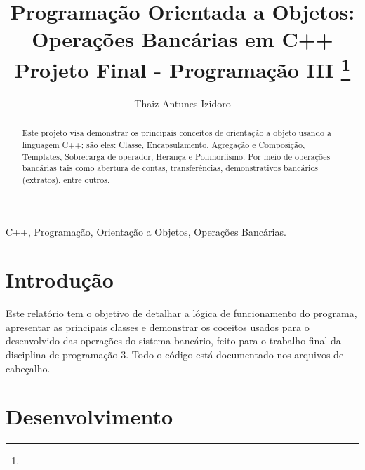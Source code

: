 \documentclass[conference]{IEEEtran}
\begin{document}
\title{Programação Orientada a Objetos: Operações Bancárias em C++\\
{\footnotesize Projeto Final - Programação III}
\thanks{}
}


\author{
\and
{Thaiz Antunes Izidoro}\\
}


\maketitle

\begin{abstract}
    Este projeto visa demonstrar os principais conceitos de orientação a objeto usando a linguagem C++; são eles: Classe, Encapsulamento, Agregação e Composição, Templates, Sobrecarga de operador, Herança e Polimorfismo. Por meio  de operações bancárias tais como abertura de contas, transferências, demonstrativos bancários (extratos), entre outros. 
\end{abstract}

\begin{IEEEkeywords}
    C++, Programação, Orientação a Objetos, Operações Bancárias.
\end{IEEEkeywords}

\section{Introdução}
Este relatório tem o objetivo de detalhar a lógica de funcionamento do programa, apresentar as principais classes e demonstrar os coceitos usados  para o desenvolvido das operações do sistema bancário, feito para o trabalho final da disciplina de programação 3. Todo o código está documentado nos arquivos de cabeçalho.

\section{Desenvolvimento}
\end{document}
